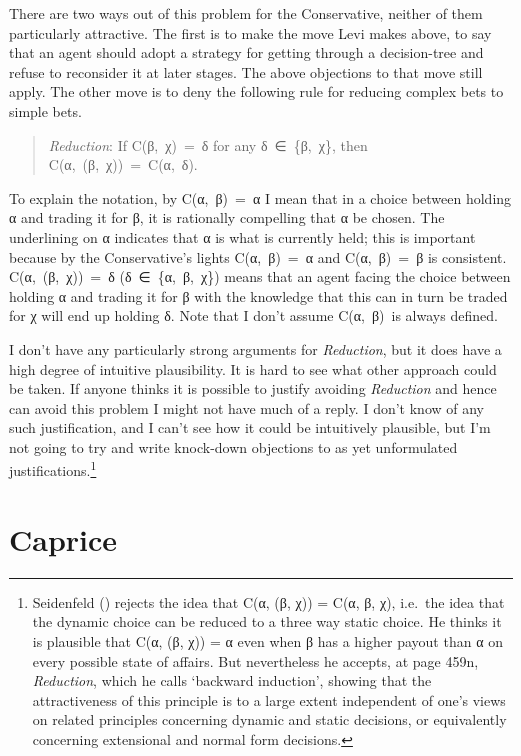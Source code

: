 \documentclass[
  10pt,
  letterpaper,
  DIV=11,
  numbers=noendperiod,
  twoside]{scrartcl}
\begin{document}
There are two ways out of this problem for the Conservative, neither of
them particularly attractive. The first is to make the move Levi makes
above, to say that an agent should adopt a strategy for getting through
a decision-tree and refuse to reconsider it at later stages. The above
objections to that move still apply. The other move is to deny the
following rule for reducing complex bets to simple bets.

\begin{quote}
\emph{Reduction}: If C(β,~χ)~=~δ for any δ~∈~\{β,~χ\}, then
C(α,~(β,~χ))~=~C(α,~δ).
\end{quote}

To explain the notation, by C(α,~β)~=~α I mean that in a choice between
holding α and trading it for β, it is rationally compelling that α be
chosen. The underlining on α indicates that α is what is currently held;
this is important because by the Conservative's lights C(α,~β)~=~α and
C(α,~β)~=~β is consistent. C(α,~(β,~χ))~=~δ (δ~∈~\{α,~β,~χ\}) means that
an agent facing the choice between holding α and trading it for β with
the knowledge that this can in turn be traded for χ will end up holding
δ. Note that I don't assume C(α,~β)~is always defined.

I don't have any particularly strong arguments for \emph{Reduction}, but
it does have a high degree of intuitive plausibility. It is hard to see
what other approach could be taken. If anyone thinks it is possible to
justify avoiding \emph{Reduction} and hence can avoid this problem I
might not have much of a reply. I don't know of any such justification,
and I can't see how it could be intuitively plausible, but I'm not going
to try and write knock-down objections to as yet unformulated
justifications.\footnote{Seidenfeld
  () rejects the idea that C(α, (β,
  χ)) = C(α, β, χ), i.e.~the idea that the dynamic choice can be reduced
  to a three way static choice. He thinks it is plausible that C(α, (β,
  χ)) = α even when β has a higher payout than α on every possible state
  of affairs. But nevertheless he accepts, at page 459n,
  \emph{Reduction}, which he calls `backward induction', showing that
  the attractiveness of this principle is to a large extent independent
  of one's views on related principles concerning dynamic and static
  decisions, or equivalently concerning extensional and normal form
  decisions.}

\section{Caprice}\label{caprice}
\end{document}
